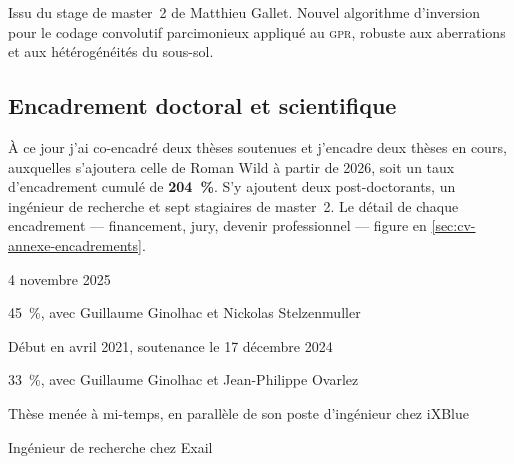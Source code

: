 Issu du stage de master~2 de Matthieu Gallet. Nouvel algorithme d'inversion pour le
codage convolutif parcimonieux appliqué au \textsc{gpr}, robuste aux aberrations
et aux hétérogénéités du sous-sol.


\subsection{Encadrement doctoral et scientifique}
\label{subsec:cv-encadrement}

À ce jour j'ai co-encadré deux thèses soutenues et j'encadre deux thèses en
cours, auxquelles s'ajoutera celle de Roman Wild à partir de 2026, soit un taux
d'encadrement cumulé de \textbf{204~\%}. S'y ajoutent deux post-doctorants, un
ingénieur de recherche et sept stagiaires de master~2. Le détail de chaque
encadrement --- financement, jury, devenir professionnel --- figure en
\cref{sec:cv-annexe-encadrements}.


\begin{cvfields}
  \item[Soutenance] 4 novembre 2025
  \item[Encadrement] 45~\%, avec Guillaume Ginolhac et Nickolas Stelzenmuller
  \item[Publications] 
\end{cvfields}

\begin{cvfields}
  \item[Calendrier] Début en avril 2021, soutenance le 17 décembre 2024
  \item[Encadrement] 33~\%, avec Guillaume Ginolhac et Jean-Philippe Ovarlez
  \item[Particularité] Thèse menée à mi-temps, en parallèle de son poste
    d'ingénieur chez iXBlue
  \item[Publications] 
  \item[Devenir] Ingénieur de recherche chez Exail
\end{cvfields}

